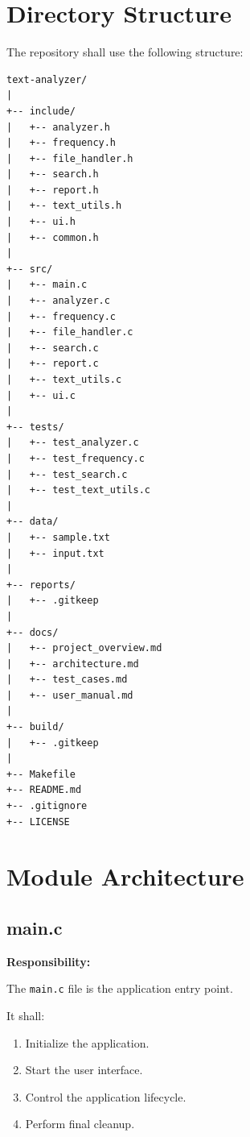 \documentclass[12pt,a4paper]{article}
\begin{document}

\section{Directory Structure}

The repository shall use the following structure:

\begin{verbatim}
text-analyzer/
|
+-- include/
|   +-- analyzer.h
|   +-- frequency.h
|   +-- file_handler.h
|   +-- search.h
|   +-- report.h
|   +-- text_utils.h
|   +-- ui.h
|   +-- common.h
|
+-- src/
|   +-- main.c
|   +-- analyzer.c
|   +-- frequency.c
|   +-- file_handler.c
|   +-- search.c
|   +-- report.c
|   +-- text_utils.c
|   +-- ui.c
|
+-- tests/
|   +-- test_analyzer.c
|   +-- test_frequency.c
|   +-- test_search.c
|   +-- test_text_utils.c
|
+-- data/
|   +-- sample.txt
|   +-- input.txt
|
+-- reports/
|   +-- .gitkeep
|
+-- docs/
|   +-- project_overview.md
|   +-- architecture.md
|   +-- test_cases.md
|   +-- user_manual.md
|
+-- build/
|   +-- .gitkeep
|
+-- Makefile
+-- README.md
+-- .gitignore
+-- LICENSE
\end{verbatim}


\section{Module Architecture}

\subsection{main.c}

\textbf{Responsibility:}

The \texttt{main.c} file is the application entry point.

It shall:

\begin{enumerate}
    \item Initialize the application.
    \item Start the user interface.
    \item Control the application lifecycle.
    \item Perform final cleanup.
\end{enumerate}
\end{document}
